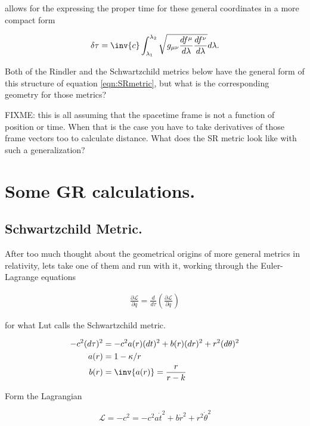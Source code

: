 \documentclass{article}      %
\newcommand{\LL}[0]{\mathcal{L}}
\newcommand{\PD}[2]{\frac{\partial {#2}}{\partial {#1}}}
\newcommand{\CC}[0]{c^2}
\newcommand{\dottheta}[0]{\dot{\theta}}
\newcommand{\qdot}[0]{\dot{q}}
\newcommand{\tdot}[0]{\dot{t}}
\newcommand{\rdot}[0]{\dot{r}}
\begin{document}
allows for the expressing the proper time for these
general coordinates in a more compact form

\begin{equation}\label{eqn:SRmetric}
\delta \tau = \inv{c} \int_{\lambda_1}^{\lambda_2} 
\sqrt{
g_{\mu\nu}
\frac{df^{\mu}}{d\lambda} \frac{df^{\nu}}{d\lambda} } d\lambda.
\end{equation}

Both of the Rindler and the Schwartzchild metrics below have 
the general form of this structure of equation
\ref{eqn:SRmetric}, but what is the corresponding geometry for those
metrics?

FIXME: this is all assuming that the spacetime frame is not a function of position or time.  When that is the case you have to take derivatives of those frame vectors
too to calculate distance.  What does the SR metric look like with such a generalization?

\section{ Some GR calculations. }

\subsection{ Schwartzchild Metric. } 

After too much thought about the geometrical origins of more general metrics in 
relativity, lets take one of them and run with it, 
working through the Euler-Lagrange equations

\begin{align*}
\PD{q}{\LL} = \frac{d}{d\tau}\left(\PD{\qdot}{\LL}\right)
\end{align*}

for what Lut calls the Schwartzchild metric.

\begin{align}
-\CC (d\tau)^2 &= -\CC a(r) (dt)^2 + {b(r)} (dr)^2 + r^2(d\theta)^2 \\
a(r) &= 1 - \kappa/r \\
b(r) &= \inv{a(r)} = \frac{r}{r-k}
\end{align}

Form the Lagrangian

\begin{equation}\label{eqn:sLagrangian}
\LL = -\CC = -\CC a \tdot^2 + b \rdot^2 + r^2 \dottheta^2 
\end{equation}
\end{document}
